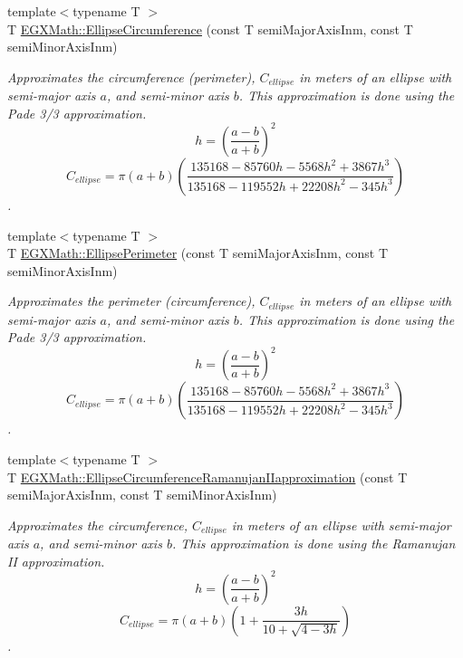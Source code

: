 \begin{DoxyCompactItemize}
\item 
{\footnotesize template$<$typename T $>$ }\\T \mbox{\hyperlink{group___e_g_x_math-_geometry-2_d-_ellipse-_circumference_ga4172802ac674eb53467b44928ac635c7}{E\+G\+X\+Math\+::\+Ellipse\+Circumference}} (const T semi\+Major\+Axis\+Inm, const T semi\+Minor\+Axis\+Inm)
\begin{DoxyCompactList}\small\item\em Approximates the circumference (perimeter), $C_{ellipse}$ in meters of an ellipse with semi-\/major axis $a$, and semi-\/minor axis $b$. This approximation is done using the Pade 3/3 approximation. \[ h=\left( \frac{a-b}{a+b} \right)^2 \] \[ C_{ellipse}=\pi (a + b) \left( \frac{135168-85760 h-5568 h^2+ 3867 h^3}{135168-119552 h+ 22208 h^2 - 345h^3} \right) \]. \end{DoxyCompactList}\item 
{\footnotesize template$<$typename T $>$ }\\T \mbox{\hyperlink{group___e_g_x_math-_geometry-2_d-_ellipse-_circumference_ga2d4ee70e08d6fb4b56209ad4fc3f38ca}{E\+G\+X\+Math\+::\+Ellipse\+Perimeter}} (const T semi\+Major\+Axis\+Inm, const T semi\+Minor\+Axis\+Inm)
\begin{DoxyCompactList}\small\item\em Approximates the perimeter (circumference), $C_{ellipse}$ in meters of an ellipse with semi-\/major axis $a$, and semi-\/minor axis $b$. This approximation is done using the Pade 3/3 approximation. \[ h=\left( \frac{a-b}{a+b} \right)^2 \] \[ C_{ellipse}=\pi (a + b) \left( \frac{135168-85760 h-5568 h^2+ 3867 h^3}{135168-119552 h+ 22208 h^2 - 345h^3} \right) \]. \end{DoxyCompactList}\item 
{\footnotesize template$<$typename T $>$ }\\T \mbox{\hyperlink{group___e_g_x_math-_geometry-2_d-_ellipse-_circumference_gaa908406db81fadc7c2d73e4e113d24d7}{E\+G\+X\+Math\+::\+Ellipse\+Circumference\+Ramanujan\+I\+Iapproximation}} (const T semi\+Major\+Axis\+Inm, const T semi\+Minor\+Axis\+Inm)
\begin{DoxyCompactList}\small\item\em Approximates the circumference, $C_{ellipse}$ in meters of an ellipse with semi-\/major axis $a$, and semi-\/minor axis $b$. This approximation is done using the Ramanujan II approximation. \[ h=\left( \frac{a-b}{a+b} \right)^2 \] \[ C_{ellipse}=\pi (a + b) \left( 1+\frac{3h}{10+\sqrt{4-3h}} \right) \]. \end{DoxyCompactList}\item 

\end{DoxyCompactItemize}
